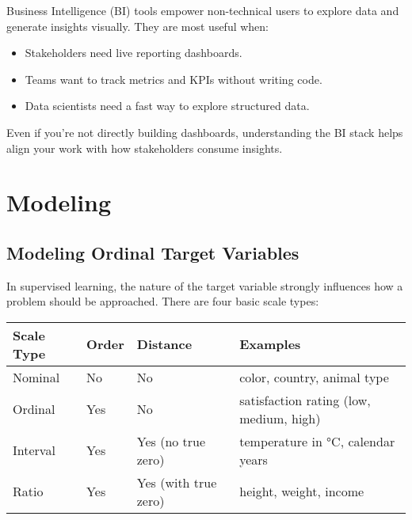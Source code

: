 \documentclass[12pt,openany, draft]{book}
\begin{document}
Business Intelligence (BI) tools empower non-technical users to explore data and generate insights visually. They are most useful when:

\begin{itemize}
    \item Stakeholders need live reporting dashboards.
    \item Teams want to track metrics and KPIs without writing code.
    \item Data scientists need a fast way to explore structured data.
\end{itemize}

\begin{notebox}
Even if you're not directly building dashboards, understanding the BI stack helps align your work with how stakeholders consume insights.
\end{notebox}





\part{Modeling}



\chapter{Modeling Ordinal Target Variables}

In supervised learning, the nature of the target variable strongly influences
how a problem should be approached. There are four basic scale types:
\newline

\begin{minipage}{\textwidth}
\centering
\renewcommand{\arraystretch}{1.3} %
\begin{tabular}{m{2.5cm} m{1.5cm} m{4cm} m{7cm}}
\toprule
\textbf{Scale Type} & \textbf{Order} & \textbf{Distance} & \textbf{Examples} \\
\midrule
Nominal   & No  & No  & color, country, animal type \\
Ordinal   & Yes & No  & satisfaction rating (low, medium, high) \\
Interval  & Yes & Yes (no true zero)  & temperature in °C, calendar years \\
Ratio     & Yes & Yes (with true zero) & height, weight, income \\
\bottomrule
\end{tabular}
\end{minipage}
\vspace{5pt}
\end{document}

